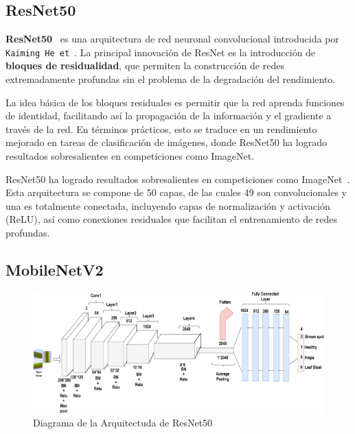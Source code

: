 \subsection{ResNet50}\label{subsec:resnet50}
\textbf{ResNet50}~\cite{noauthor_resnet50_nodate} es una arquitectura de red neuronal convolucional introducida por
\texttt{Kaiming He et}~\cite{he_deep_2016}.
La principal innovación de ResNet es la introducción de \textbf{bloques de residualidad}, que permiten la construcción
de redes extremadamente profundas sin el problema de la degradación del rendimiento.


La idea básica de los bloques residuales es permitir que la red aprenda funciones de identidad, facilitando así la
propagación de la información y el gradiente a través de la red.
En términos prácticos, esto se traduce en un rendimiento mejorado en tareas de clasificación de imágenes, donde
ResNet50 ha logrado resultados sobresalientes en competiciones como ImageNet.


ResNet50 ha logrado resultados sobresalientes en competiciones como ImageNet~\cite{alnuaim_human-computer_2022}.
Esta arquitectura se compone de 50 capas, de las cuales 49 son convolucionales y una es totalmente conectada,
incluyendo capas de normalización y activación (ReLU), así como conexiones residuales que facilitan el entrenamiento de
redes profundas.

\subsection{MobileNetV2}\label{subsec:mobilenet}

\begin{figure}[htp] \label{fig:resnet50}
    \begin{center}
        \includegraphics[width=1\textwidth]{imagenes/resnet50}
    \end{center}
    \caption[ResNet50]{Diagrama de la Arquitectuda de ResNet50}
\end{figure}

